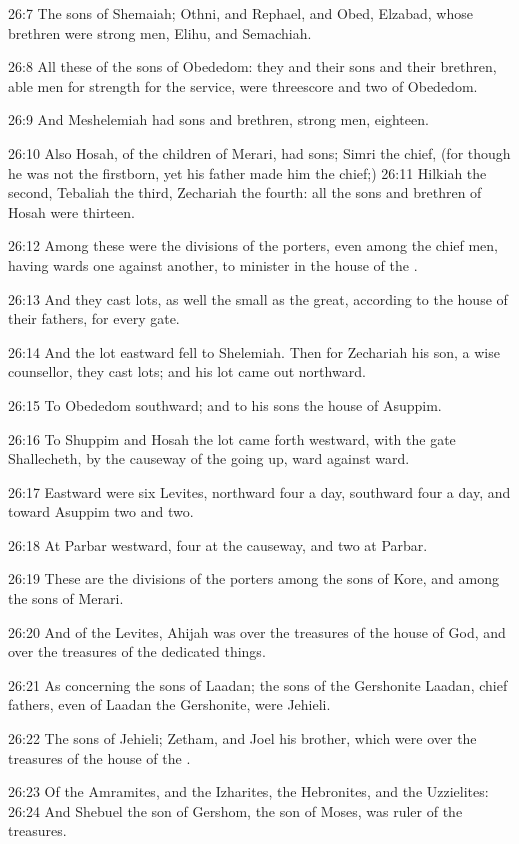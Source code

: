 26:7 The sons of Shemaiah; Othni, and Rephael, and Obed, Elzabad, whose brethren were strong men, Elihu, and Semachiah.

26:8 All these of the sons of Obededom: they and their sons and their brethren, able men for strength for the service, were threescore and two of Obededom.

26:9 And Meshelemiah had sons and brethren, strong men, eighteen.

26:10 Also Hosah, of the children of Merari, had sons; Simri the chief, (for though he was not the firstborn, yet his father made him the chief;) 26:11 Hilkiah the second, Tebaliah the third, Zechariah the fourth: all the sons and brethren of Hosah were thirteen.

26:12 Among these were the divisions of the porters, even among the chief men, having wards one against another, to minister in the house of the \LORD.

26:13 And they cast lots, as well the small as the great, according to the house of their fathers, for every gate.

26:14 And the lot eastward fell to Shelemiah. Then for Zechariah his son, a wise counsellor, they cast lots; and his lot came out northward.

26:15 To Obededom southward; and to his sons the house of Asuppim.

26:16 To Shuppim and Hosah the lot came forth westward, with the gate Shallecheth, by the causeway of the going up, ward against ward.

26:17 Eastward were six Levites, northward four a day, southward four a day, and toward Asuppim two and two.

26:18 At Parbar westward, four at the causeway, and two at Parbar.

26:19 These are the divisions of the porters among the sons of Kore, and among the sons of Merari.

26:20 And of the Levites, Ahijah was over the treasures of the house of God, and over the treasures of the dedicated things.

26:21 As concerning the sons of Laadan; the sons of the Gershonite Laadan, chief fathers, even of Laadan the Gershonite, were Jehieli.

26:22 The sons of Jehieli; Zetham, and Joel his brother, which were over the treasures of the house of the \LORD.

26:23 Of the Amramites, and the Izharites, the Hebronites, and the Uzzielites: 26:24 And Shebuel the son of Gershom, the son of Moses, was ruler of the treasures.

